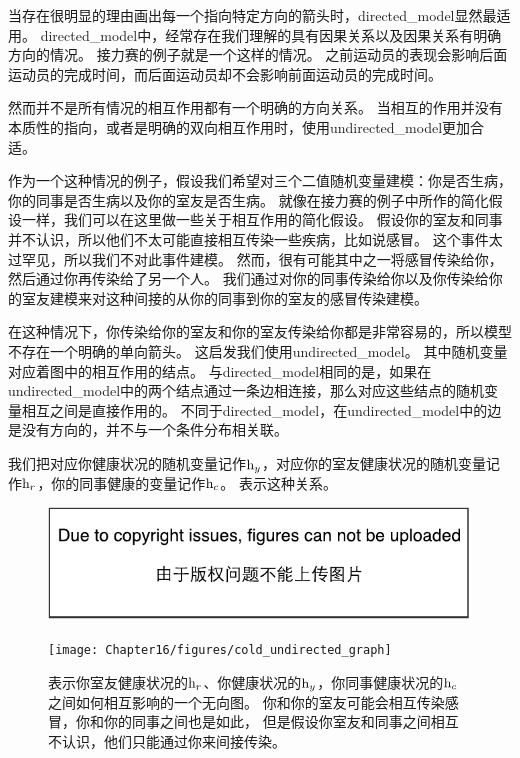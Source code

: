 当存在很明显的理由画出每一个指向特定方向的箭头时，\gls{directed_model}显然最适用。
\gls{directed_model}中，经常存在我们理解的具有因果关系以及因果关系有明确方向的情况。
接力赛的例子就是一个这样的情况。
之前运动员的表现会影响后面运动员的完成时间，而后面运动员却不会影响前面运动员的完成时间。


然而并不是所有情况的相互作用都有一个明确的方向关系。
当相互的作用并没有本质性的指向，或者是明确的双向相互作用时，使用\gls{undirected_model}更加合适。


作为一个这种情况的例子，假设我们希望对三个二值随机变量建模：你是否生病，你的同事是否生病以及你的室友是否生病。
就像在接力赛的例子中所作的简化假设一样，我们可以在这里做一些关于相互作用的简化假设。
假设你的室友和同事并不认识，所以他们不太可能直接相互传染一些疾病，比如说感冒。
这个事件太过罕见，所以我们不对此事件建模。
然而，很有可能其中之一将感冒传染给你，然后通过你再传染给了另一个人。
我们通过对你的同事传染给你以及你传染给你的室友建模来对这种间接的从你的同事到你的室友的感冒传染建模。


在这种情况下，你传染给你的室友和你的室友传染给你都是非常容易的，所以模型不存在一个明确的单向箭头。
这启发我们使用\gls{undirected_model}。
其中随机变量对应着图中的相互作用的结点。
与\gls{directed_model}相同的是，如果在\gls{undirected_model}中的两个结点通过一条边相连接，那么对应这些结点的随机变量相互之间是直接作用的。
不同于\gls{directed_model}，在\gls{undirected_model}中的边是没有方向的，并不与一个条件分布相关联。


我们把对应你健康状况的随机变量记作$\mathrm{h}_y$，对应你的室友健康状况的随机变量记作$\mathrm{h}_r$，你的同事健康的变量记作$\mathrm{h}_c$。
表示这种关系。

\begin{figure}[!htb]
\ifOpenSource
\centerline{\includegraphics{figure.pdf}}
\else
	\centerline{\texttt{[image: Chapter16/figures/cold\_undirected\_graph]}}	
\fi
\caption{表示你室友健康状况的$\mathrm{h}_r$、你健康状况的$\mathrm{h}_y$，你同事健康状况的$\mathrm{h}_c$之间如何相互影响的一个无向图。
你和你的室友可能会相互传染感冒，你和你的同事之间也是如此，
但是假设你室友和同事之间相互不认识，他们只能通过你来间接传染。}
	\label{fig:cold_undirected_graph}
\end{figure}


